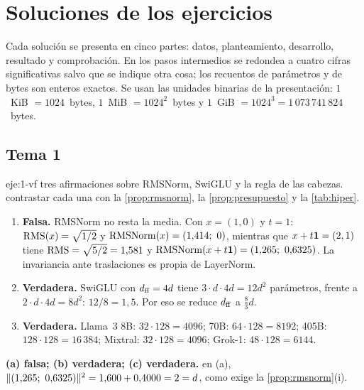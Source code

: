 \chapter{Soluciones de los ejercicios}
\label{ap:soluciones}

Cada solución se presenta en cinco partes: datos, planteamiento, desarrollo, resultado y comprobación. En los pasos intermedios se redondea a cuatro cifras significativas salvo que se indique otra cosa; los recuentos de parámetros y de bytes son enteros exactos. Se usan las unidades binarias de la presentación: $1$~KiB $=1024$~bytes, $1$~MiB $=1024^{2}$~bytes y $1$~GiB $=1024^{3}=1\,073\,741\,824$~bytes.

\section{Tema 1}

\begin{solucion}{eje:1-vf}
\datos tres afirmaciones sobre RMSNorm, SwiGLU y la regla de las cabezas.
\planteamiento contrastar cada una con la \cref{prop:rmsnorm}, la \cref{prop:presupuesto} y la \cref{tab:hiper}.
\pasos
\begin{enumerate}[label=(\alph*)]
  \item \textbf{Falsa.} RMSNorm no resta la media. Con $x=(1,0)$ y $t=1$: $\operatorname{RMS}(x)=\sqrt{1/2}$ y $\operatorname{RMSNorm}(x)=(1{,}414;\ 0)$, mientras que $x+t\mathbf{1}=(2,1)$ tiene $\operatorname{RMS}=\sqrt{5/2}=1{,}581$ y $\operatorname{RMSNorm}(x+t\mathbf{1})=(1{,}265;\ 0{,}6325)$. La invariancia ante traslaciones es propia de LayerNorm.
  \item \textbf{Verdadera.} SwiGLU con $d_{\mathrm{ff}}=4d$ tiene $3\cdot d\cdot 4d=12d^{2}$ parámetros, frente a $2\cdot d\cdot 4d=8d^{2}$: $12/8=1{,}5$. Por eso se reduce $d_{\mathrm{ff}}$ a $\frac83 d$.
  \item \textbf{Verdadera.} Llama~3 8B: $32\cdot 128=4096$; 70B: $64\cdot 128=8192$; 405B: $128\cdot 128=16\,384$; Mixtral: $32\cdot 128=4096$; Grok-1: $48\cdot 128=6144$.
\end{enumerate}
\resultado \textbf{(a) falsa; (b) verdadera; (c) verdadera.}
\comprobacion en (a), $\norm{(1{,}265;\ 0{,}6325)}^{2}=1{,}600+0{,}4000=2=d$, como exige la \cref{prop:rmsnorm}(i).
\end{solucion}

